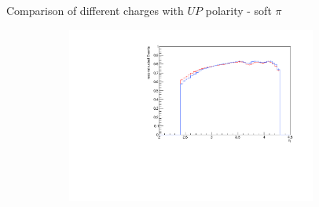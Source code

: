 \documentclass[11pt]{beamer}
\begin{document}
\begin{frame}{Comparison of different charges with $UP$ polarity - soft $\pi$}
\begin{figure}
\begin{subfigure}{0.45\textwidth}
\end{subfigure}
\begin{subfigure}{0.45\textwidth}
\includegraphics[width=0.9\textwidth]{fourth/up_pdf/combined/h_eta_reco_SPi.pdf}
\end{subfigure}
\end{figure}
\end{frame}
\end{document}
